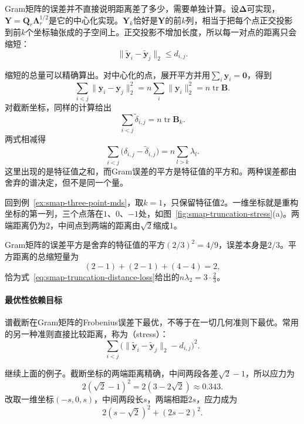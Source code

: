 Gram矩阵的误差并不直接说明距离差了多少，需要单独计算。设$\bm\Delta$可实现，$\bm Y=\bm Q_r\bm\Lambda_r^{1/2}$是它的中心化实现。$\bm Y_k$恰好是$\bm Y$的前$k$列，相当于把每个点正交投影到前$k$个坐标轴张成的子空间上。正交投影不增加长度，所以每一对点的距离只会缩短：
\[
 \lVert\widetilde{\bm y}_i-\widetilde{\bm y}_j\rVert_2\leq d_{i,j}.
\]

缩短的总量可以精确算出。对中心化的点，展开平方并用$\sum_i\bm y_i=\bm0$，得到
\begin{equation}
 \sum_{i<j}\lVert\bm y_i-\bm y_j\rVert_2^2=n\sum_i\lVert\bm y_i\rVert_2^2=n\operatorname{tr}\bm B .
 \label{eq:smap-distance-sum-trace}
\end{equation}
对截断坐标，同样的计算给出
\[
 \sum_{i<j}\widetilde\delta_{i,j}=n\operatorname{tr}\bm B_k .
\]
两式相减得
\begin{equation}
 \sum_{i<j}\bigl(\delta_{i,j}-\widetilde\delta_{i,j}\bigr)=n\sum_{l>k}\lambda_l .
 \label{eq:smap-truncation-distance-loss}
\end{equation}
这里出现的是特征值之和，而Gram误差的平方是特征值的平方和。两种误差都由舍弃的谱决定，但不是同一个量。

\begin{example}[三个点的一维近似]
\label{ex:smap-one-dimensional}
回到例~\ref{ex:smap-three-point-mds}，取$k=1$，只保留特征值$2$。一维坐标就是重构坐标的第一列，三个点落在$1$、$0$、$-1$处，如图~\ref{fig:smap-truncation-stress}(a)。两端距离仍为$2$，中间点到两端的距离由$\sqrt2$缩成$1$。

Gram矩阵的误差平方是舍弃的特征值的平方$(2/3)^2=4/9$，误差本身是$2/3$。平方距离的总缩短量为
\[
 (2-1)+(2-1)+(4-4)=2 ,
\]
恰为式~\eqref{eq:smap-truncation-distance-loss}给出的$n\lambda_2=3\cdot\frac23$。
\end{example}

\paragraph{最优性依赖目标}

谱截断在Gram矩阵的Frobenius误差下最优，不等于在一切几何准则下最优。常用的另一种准则直接比较距离，称为（stress）：
\begin{equation}
 \sum_{i<j}\bigl(\lVert\widetilde{\bm y}_i-\widetilde{\bm y}_j\rVert_2-d_{i,j}\bigr)^2 .
 \label{eq:smap-stress}
\end{equation}

继续上面的例子。截断坐标的两端距离精确，中间两段各差$\sqrt2-1$，所以应力为
\[
 2(\sqrt2-1)^2=2(3-2\sqrt2)\approx0.343 .
\]
改取一维坐标$(-s,0,s)$，中间两段长$s$，两端相距$2s$，应力成为
\[
 2(s-\sqrt2)^2+(2s-2)^2 .
\]

